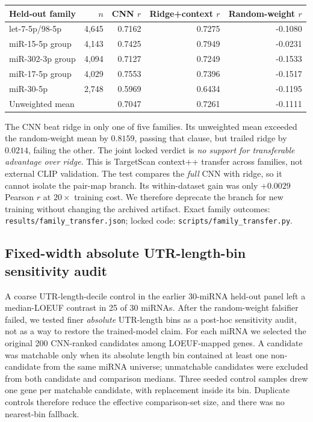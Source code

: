\documentclass[11pt]{article}
\begin{document}
\begin{center}
\begin{tabular}{lrrrr}
Held-out family & $n$ & CNN $r$ & Ridge+context $r$ & Random-weight $r$\\
\hline
let-7-5p/98-5p & 4{,}645 & 0.7162 & 0.7275 & -0.1080\\
miR-15-5p group & 4{,}143 & 0.7425 & 0.7949 & -0.0231\\
miR-302-3p group & 4{,}094 & 0.7127 & 0.7249 & -0.1533\\
miR-17-5p group & 4{,}029 & 0.7553 & 0.7396 & -0.1517\\
miR-30-5p & 2{,}748 & 0.5969 & 0.6434 & -0.1195\\
\hline
Unweighted mean & & 0.7047 & 0.7261 & -0.1111\\
\end{tabular}
\end{center}
The CNN beat ridge in only one of five families. Its unweighted mean exceeded
the random-weight mean by $0.8159$, passing that clause, but trailed ridge by
$0.0214$, failing the other. The joint locked verdict is \emph{no support for
transferable advantage over ridge}. This is TargetScan context++ transfer across families, not external CLIP
validation. The test compares the \emph{full} CNN with ridge, so it cannot
isolate the pair-map branch. Its within-dataset gain was only $+0.0029$
Pearson $r$ at $20\times$ training cost. We therefore deprecate the branch
for new training without changing the archived artifact. Exact family outcomes:
\texttt{results/family\_transfer.json}; locked code:
\texttt{scripts/family\_transfer.py}.

\subsection{Fixed-width absolute UTR-length-bin sensitivity audit}
A coarse UTR-length-decile control in the earlier 30-miRNA held-out panel
left a median-LOEUF contrast in 25 of 30 miRNAs. After the random-weight
falsifier failed, we tested finer \emph{absolute} UTR-length bins as a
post-hoc sensitivity audit, not as a way to restore the trained-model claim.
For each miRNA we selected the original 200 CNN-ranked candidates among
LOEUF-mapped genes. A candidate was matchable only when its absolute length
bin contained at least one non-candidate from the same miRNA universe;
unmatchable candidates were excluded from both candidate and comparison
medians. Three seeded control samples drew one gene per matchable candidate,
with replacement inside its bin. Duplicate controls therefore reduce the
effective comparison-set size, and there was no nearest-bin fallback.
\end{document}
